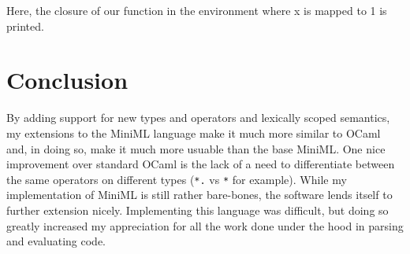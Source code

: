 \documentclass[10pt,letterpaper]{article}
\begin{document}
Here, the closure of our function in the environment where x is mapped to 1 is printed. 



\section*{Conclusion}
By adding support for new types and operators and lexically scoped semantics, my extensions to the MiniML language make it much more similar to OCaml and, in doing so, make it much more usuable than the base MiniML. One nice improvement over standard OCaml is the lack of a need to differentiate between the same operators on different types (\verb|*.| vs \verb|*| for example). While my implementation of MiniML is still rather bare-bones, the software lends itself to further extension nicely. Implementing this language was difficult, but doing so greatly increased my appreciation for all the work done under the hood in parsing and evaluating code. 
\end{document}
